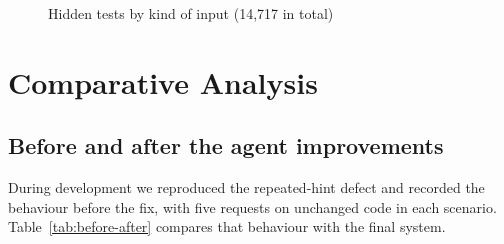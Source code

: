 \begin{figure}[htbp]\centering
{}
\caption{Hidden tests by kind of input (14,717 in total)}\label{fig:categories}
\end{figure}

\section{Comparative Analysis}\label{sec:compare}
\subsection{Before and after the agent improvements}
During development we reproduced the repeated-hint defect and recorded the behaviour before the fix, with five requests on unchanged code in each scenario. Table~\ref{tab:before-after} compares that behaviour with the final system.

